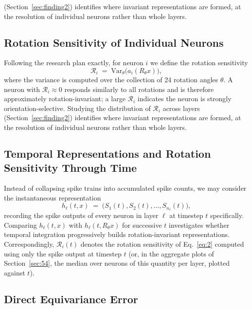\documentclass[11pt]{article}
\begin{document}
(Section~\ref{sec:finding2}) identifies where invariant representations are formed, at the
resolution of individual neurons rather than whole layers.

\subsection{Rotation Sensitivity of Individual Neurons}
\label{sec:Ri}

Following the research plan exactly, for neuron $i$ we define the rotation sensitivity
\begin{equation}
\mathcal{R}_i \;=\; \mathrm{Var}_\theta\big(a_i(R_\theta x)\big), \label{eq:2}
\end{equation}
where the variance is computed over the collection of 24 rotation angles $\theta$. A neuron with
$\mathcal{R}_i \approx 0$ responds similarly to all rotations and is therefore approximately
rotation-invariant; a large $\mathcal{R}_i$ indicates the neuron is strongly orientation-selective.
Studying the distribution of $\mathcal{R}_i$ across layers (Section~\ref{sec:finding2}) identifies
where invariant representations are formed, at the resolution of individual neurons rather than whole
layers.

\subsection{Temporal Representations and Rotation Sensitivity Through Time}

Instead of collapsing spike trains into accumulated spike counts, we may consider the instantaneous
representation
\[
h_\ell(t, x) \;=\; \big(S_1(t), S_2(t), \ldots, S_{n_\ell}(t)\big),
\]
recording the spike outputs of every neuron in layer $\ell$ at timestep $t$ specifically. Comparing
$h_\ell(t, x)$ with $h_\ell(t, R_\theta x)$ for successive $t$ investigates whether temporal
integration progressively builds rotation-invariant representations. Correspondingly,
$\mathcal{R}_i(t)$ denotes the rotation sensitivity of Eq.~\ref{eq:2} computed using only the spike
output at timestep $t$ (or, in the aggregate plots of Section~\ref{sec:54}, the median over neurons
of this quantity per layer, plotted against $t$).

\subsection{Direct Equivariance Error}
\end{document}
